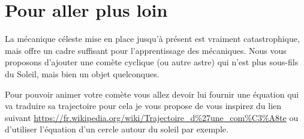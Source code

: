 \documentclass[a4paper,10pt]{article}
\begin{document}
\fi 
	

\section{Pour aller plus loin}

La mécanique céleste mise en place jusqu'à présent est vraiment catastrophique, mais offre un cadre suffisant pour l'apprentissage des mécaniques. Nous vous proposons d'ajouter une comète cyclique (ou autre astre) qui n'est plus sous-fils du Soleil, mais bien un objet quelconques.

Pour pouvoir animer votre comète vous allez devoir lui fournir une équation qui va traduire sa trajectoire pour cela je vous propose de vous inspirez du lien suivant \url{https://fr.wikipedia.org/wiki/Trajectoire_d%27une_com%C3%A8te}
ou d'utiliser l'équation d'un cercle autour du soleil par exemple.
\end{document}
